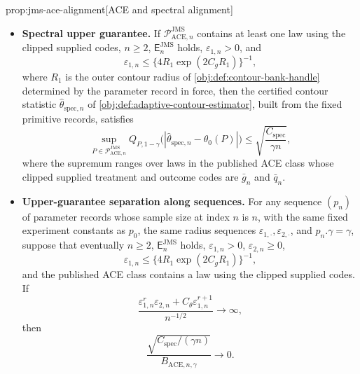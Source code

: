 \documentclass[11pt]{article}
\begin{document}
\begin{propositionv}{prop:jms-ace-alignment}[ACE and spectral alignment]
\begin{itemize}
\item \textbf{Spectral upper guarantee.} If
\(\mathcal P_{\mathrm{ACE},n}^{\mathrm{JMS}}\) contains at least one law using
the clipped supplied codes, \(n\ge2\), \(\mathsf E_n^{\mathrm{JMS}}\) holds,
\(\varepsilon_{1,n}>0\), and
\[
 \varepsilon_{1,n}
 \le
 \{4R_1\exp(2C_gR_1)\}^{-1},
\]
where \(R_1\) is the outer contour radius of \cref{obj:def:contour-bank-handle} determined by the parameter record in force,
then the certified contour statistic
\(\widehat\theta_{\mathrm{spec},n}\) of
\cref{obj:def:adaptive-contour-estimator}, built from the fixed primitive
records, satisfies
\[
 \sup_{P\in\mathcal P_{\mathrm{ACE},n}^{\mathrm{JMS}}}
 Q_{P,1-\gamma}
 \bigl(|\widehat\theta_{\mathrm{spec},n}-\theta_0(P)|\bigr)
 \le
 \sqrt{\frac{C_{\mathrm{spec}}}{\gamma n}},
\]
where the supremum ranges over laws in the published ACE class whose clipped
supplied treatment and outcome codes are \(\bar g_n\) and \(\bar q_n\).

\item \textbf{Upper-guarantee separation along sequences.} For any sequence
\((p_n)\) of parameter records whose sample size at index \(n\) is \(n\), with the
same fixed experiment constants as \(p_0\),
the same radius sequences \(\varepsilon_{1,\cdot},\varepsilon_{2,\cdot}\),
and \(p_n.\gamma=\gamma\), suppose that eventually
\(n\ge2\), \(\mathsf E_n^{\mathrm{JMS}}\) holds,
\(\varepsilon_{1,n}>0\), \(\varepsilon_{2,n}\ge0\),
\[
 \varepsilon_{1,n}
 \le
 \{4R_1\exp(2C_gR_1)\}^{-1},
\]
and the published ACE class contains a law using the clipped supplied codes.
If
\[
 \frac{
   \varepsilon_{1,n}^r\varepsilon_{2,n}
   + C_{\theta}\varepsilon_{1,n}^{r+1}
 }{n^{-1/2}}
 \longrightarrow \infty,
\]
then
\[
 \frac{
   \sqrt{C_{\mathrm{spec}}/(\gamma n)}
 }{
   B_{\mathrm{ACE},n,\gamma}
 }
 \longrightarrow 0 .
\]
\end{itemize}
\end{propositionv}
\end{document}
